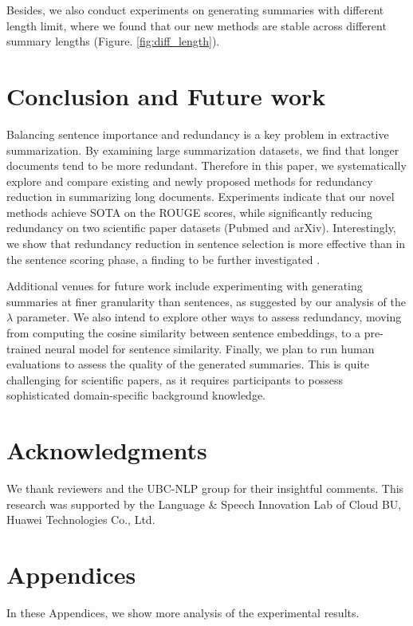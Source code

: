\documentclass[11pt,a4paper]{article}
\begin{document}
Besides, we also conduct experiments on generating summaries with different length limit, where we found that our new methods are stable across different summary lengths (Figure. \ref{fig:diff_length}).

\section{Conclusion and Future work}
Balancing sentence importance and redundancy is a key problem in extractive summarization. By examining large summarization datasets, we find that longer documents tend to be more redundant. Therefore in this paper, we systematically explore and compare existing and newly proposed methods  for redundancy reduction in summarizing long documents. Experiments indicate that our novel methods achieve SOTA on the ROUGE scores, while significantly reducing  redundancy on two scientific paper datasets (Pubmed and arXiv). Interestingly, we show that redundancy reduction in sentence selection is more effective than in the sentence scoring phase, a finding to be further investigated . 




Additional venues for future work include experimenting with generating summaries at finer granularity than sentences, as suggested by our analysis of the $\lambda$ parameter. We also intend to explore other ways to assess  redundancy, moving from computing the cosine similarity between sentence embeddings, to a pre-trained neural model for sentence similarity. Finally, we plan to run human evaluations to assess the quality of the generated summaries. This is quite challenging for scientific papers, as it requires participants to possess sophisticated domain-specific background knowledge.


\section*{Acknowledgments}
\vspace{-1mm}
We thank reviewers and the UBC-NLP group for their insightful comments.
This research was supported by the Language \& Speech Innovation Lab of Cloud BU, Huawei Technologies Co., Ltd.


\appendix
\section{Appendices}
In these Appendices, we show more analysis of the experimental results. 
\end{document}
